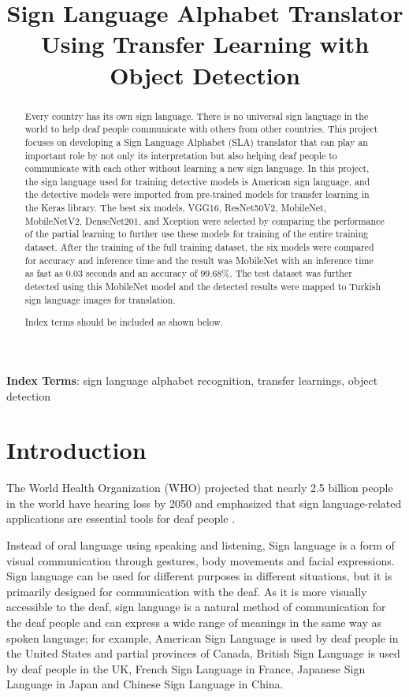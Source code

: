\documentclass[a4paper]{article}
\title{Sign Language Alphabet Translator Using Transfer Learning with Object Detection}
\begin{document}
\maketitle
%
\begin{abstract}
  Every country has its own sign language. There is no universal sign language in the world to help deaf people communicate with others from other countries. This project focuses on developing a Sign Language Alphabet (SLA) translator that can play an important role by not only its interpretation but also helping deaf people to communicate with each other without learning a new sign language. In this project, the sign language used for training detective models is American sign language, and the detective models were imported from pre-trained models for transfer learning in the Keras library. The best six models, VGG16, ResNet50V2, MobileNet, MobileNetV2, DenseNet201, and Xception were selected by comparing the performance of the partial learning to further use these models for training of the entire training dataset. After the training of the full training dataset, the six models were compared for accuracy and inference time and the result was MobileNet with an inference time as fast as 0.03 seconds and an accuracy of 99.68\%. The test dataset was further detected using this MobileNet model and the detected results were mapped to Turkish sign language images for translation.

  Index terms should be included as shown below.
\end{abstract}
\noindent\textbf{Index Terms}: sign language alphabet recognition, transfer learnings, object detection

\section{Introduction}
The World Health Organization (WHO) projected that nearly 2.5 billion people in the world have hearing loss by 2050 and emphasized that sign language-related applications are essential tools for deaf people \cite{WHO2050}.

Instead of oral language using speaking and listening, Sign language is a form of visual communication through gestures, body movements and facial expressions. Sign language can be used for different purposes in different situations, but it is primarily designed for communication with the deaf. As it is more visually accessible to the deaf, sign language is a natural method of communication for the deaf people and can express a wide range of meanings in the same way as spoken language; for example, American Sign Language is used by deaf people in the United States and partial provinces of Canada, British Sign Language is used by deaf people in the UK, French Sign Language in France, Japanese Sign Language in Japan and Chinese Sign Language in China.
\end{document}
